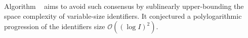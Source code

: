 \begin{asparadesc}
  Algorithm \LSEQ~\cite{nedelec2013lseq} aims to avoid such consensus by
  sublinearly upper-bounding the space complexity of variable-size
  identifiers. It conjectured a polylogarithmic progression of the identifiers
  size $\mathcal{O}((\log I)^2)$. 


\end{asparadesc}


